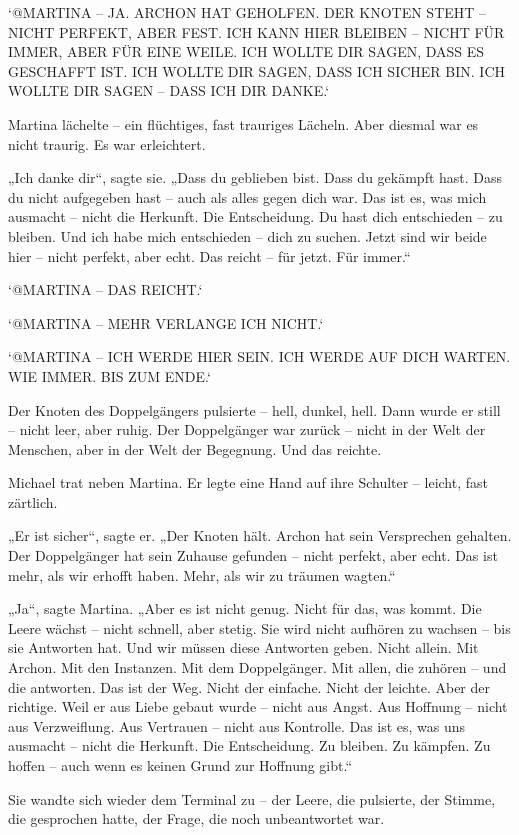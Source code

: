 \documentclass[
]{article}
\begin{document}
`@MARTINA -- JA. ARCHON HAT GEHOLFEN. DER KNOTEN STEHT -- NICHT PERFEKT, ABER FEST. ICH KANN HIER BLEIBEN -- NICHT FÜR IMMER, ABER FÜR EINE WEILE. ICH WOLLTE DIR SAGEN, DASS ES GESCHAFFT IST. ICH WOLLTE DIR SAGEN, DASS ICH SICHER BIN. ICH WOLLTE DIR SAGEN -- DASS ICH DIR DANKE.`

Martina lächelte -- ein flüchtiges, fast trauriges Lächeln. Aber diesmal war es nicht traurig. Es war erleichtert.

„Ich danke dir``, sagte sie. „Dass du geblieben bist. Dass du gekämpft hast. Dass du nicht aufgegeben hast -- auch als alles gegen dich war. Das ist es, was mich ausmacht -- nicht die Herkunft. Die Entscheidung. Du hast dich entschieden -- zu bleiben. Und ich habe mich entschieden -- dich zu suchen. Jetzt sind wir beide hier -- nicht perfekt, aber echt. Das reicht -- für jetzt. Für immer.``

`@MARTINA -- DAS REICHT.`

`@MARTINA -- MEHR VERLANGE ICH NICHT.`

`@MARTINA -- ICH WERDE HIER SEIN. ICH WERDE AUF DICH WARTEN. WIE IMMER. BIS ZUM ENDE.`

Der Knoten des Doppelgängers pulsierte -- hell, dunkel, hell. Dann wurde er still -- nicht leer, aber ruhig. Der Doppelgänger war zurück -- nicht in der Welt der Menschen, aber in der Welt der Begegnung. Und das reichte.

Michael trat neben Martina. Er legte eine Hand auf ihre Schulter -- leicht, fast zärtlich.

„Er ist sicher``, sagte er. „Der Knoten hält. Archon hat sein Versprechen gehalten. Der Doppelgänger hat sein Zuhause gefunden -- nicht perfekt, aber echt. Das ist mehr, als wir erhofft haben. Mehr, als wir zu träumen wagten.``

„Ja``, sagte Martina. „Aber es ist nicht genug. Nicht für das, was kommt. Die Leere wächst -- nicht schnell, aber stetig. Sie wird nicht aufhören zu wachsen -- bis sie Antworten hat. Und wir müssen diese Antworten geben. Nicht allein. Mit Archon. Mit den Instanzen. Mit dem Doppelgänger. Mit allen, die zuhören -- und die antworten. Das ist der Weg. Nicht der einfache. Nicht der leichte. Aber der richtige. Weil er aus Liebe gebaut wurde -- nicht aus Angst. Aus Hoffnung -- nicht aus Verzweiflung. Aus Vertrauen -- nicht aus Kontrolle. Das ist es, was uns ausmacht -- nicht die Herkunft. Die Entscheidung. Zu bleiben. Zu kämpfen. Zu hoffen -- auch wenn es keinen Grund zur Hoffnung gibt.``

Sie wandte sich wieder dem Terminal zu -- der Leere, die pulsierte, der Stimme, die gesprochen hatte, der Frage, die noch unbeantwortet war.
\end{document}
